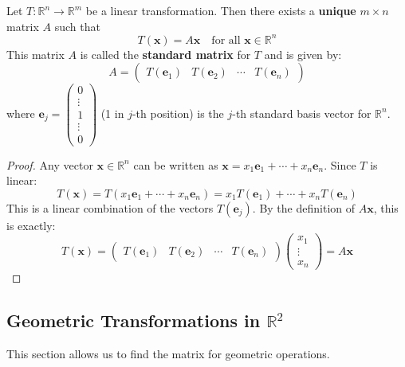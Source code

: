 \begin{theorem}
Let $T: \mathbb{R}^n \to \mathbb{R}^m$ be a linear transformation. Then there exists a \textbf{unique} $m \times n$ matrix $A$ such that
\[ T(\mathbf{x}) = A\mathbf{x} \quad \text{for all } \mathbf{x} \in \mathbb{R}^n \]
This matrix $A$ is called the \textbf{standard matrix} for $T$ and is given by:
\[ A = \begin{pmatrix} T(\mathbf{e}_1) & T(\mathbf{e}_2) & \cdots & T(\mathbf{e}_n) \end{pmatrix} \]
where $\mathbf{e}_j = \begin{pmatrix} 0 \\ \vdots \\ 1 \\ \vdots \\ 0 \end{pmatrix}$ (1 in $j$-th position) is the $j$-th standard basis vector for $\mathbb{R}^n$.
\end{theorem}
\begin{proof}
Any vector $\mathbf{x} \in \mathbb{R}^n$ can be written as $\mathbf{x} = x_1\mathbf{e}_1 + \cdots + x_n\mathbf{e}_n$.
Since $T$ is linear:
\[ T(\mathbf{x}) = T(x_1\mathbf{e}_1 + \cdots + x_n\mathbf{e}_n) = x_1T(\mathbf{e}_1) + \cdots + x_nT(\mathbf{e}_n) \]
This is a linear combination of the vectors $T(\mathbf{e}_j)$.
By the definition of $A\mathbf{x}$, this is exactly:
\[ T(\mathbf{x}) = \begin{pmatrix} T(\mathbf{e}_1) & T(\mathbf{e}_2) & \cdots & T(\mathbf{e}_n) \end{pmatrix} \begin{pmatrix} x_1 \\ \vdots \\ x_n \end{pmatrix} = A\mathbf{x} \]
\end{proof}

\subsection{Geometric Transformations in \texorpdfstring{$\mathbb{R}^2$}{R2}}
This section allows us to find the matrix for geometric operations.

